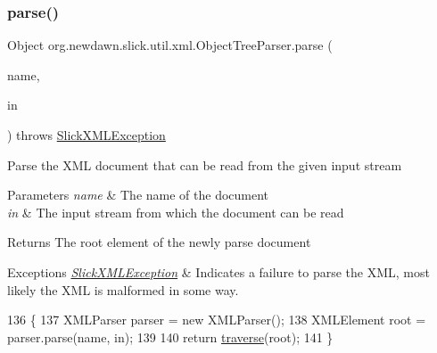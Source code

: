\subsubsection{\texorpdfstring{parse()}{parse()}\hspace{0.1cm}{\footnotesize\ttfamily [2/2]}}
{\footnotesize\ttfamily Object org.\+newdawn.\+slick.\+util.\+xml.\+Object\+Tree\+Parser.\+parse (\begin{DoxyParamCaption}\item[{String}]{name,  }\item[{Input\+Stream}]{in }\end{DoxyParamCaption}) throws \mbox{\hyperlink{classorg_1_1newdawn_1_1slick_1_1util_1_1xml_1_1_slick_x_m_l_exception}{Slick\+X\+M\+L\+Exception}}\hspace{0.3cm}{\ttfamily [inline]}}

Parse the X\+ML document that can be read from the given input stream


\begin{DoxyParams}{Parameters}
{\em name} & The name of the document \\
\hline
{\em in} & The input stream from which the document can be read \\
\hline
\end{DoxyParams}
\begin{DoxyReturn}{Returns}
The root element of the newly parse document 
\end{DoxyReturn}

\begin{DoxyExceptions}{Exceptions}
{\em \mbox{\hyperlink{classorg_1_1newdawn_1_1slick_1_1util_1_1xml_1_1_slick_x_m_l_exception}{Slick\+X\+M\+L\+Exception}}} & Indicates a failure to parse the X\+ML, most likely the X\+ML is malformed in some way. \\
\hline
\end{DoxyExceptions}

\begin{DoxyCode}
136                                                                               \{
137         XMLParser parser = \textcolor{keyword}{new} XMLParser();
138         XMLElement root = parser.parse(name, in);
139         
140         \textcolor{keywordflow}{return} \mbox{\hyperlink{classorg_1_1newdawn_1_1slick_1_1util_1_1xml_1_1_object_tree_parser_a1adc20e7ba6879b553d681e59f182126}{traverse}}(root);
141     \}
\end{DoxyCode}
\mbox{\label{classorg_1_1newdawn_1_1slick_1_1util_1_1xml_1_1_object_tree_parser_ae2b6f03bcd08a6968a300f58e0b24f2e}} 
